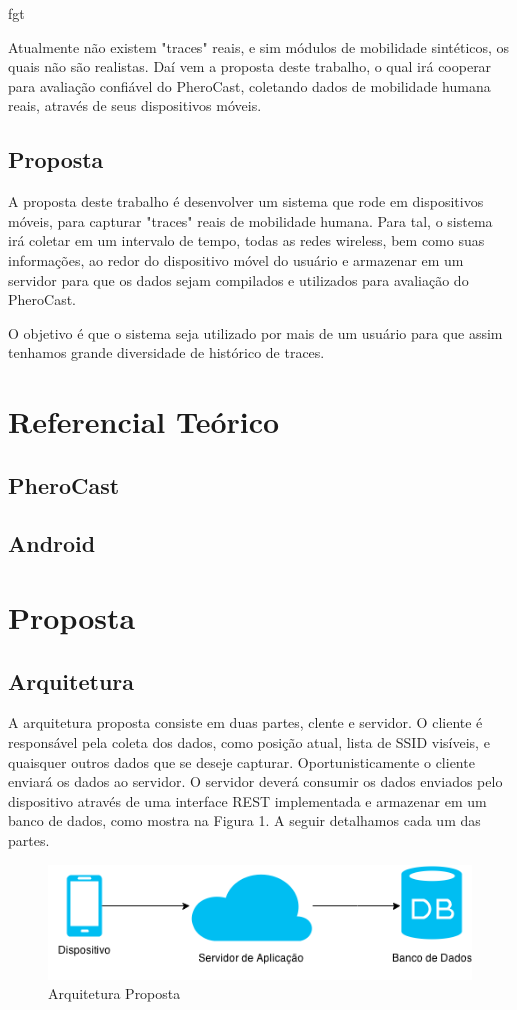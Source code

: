 fgt\documentclass[12pt, %
openright, 
oneside, %
a4paper,    %
brazil]{facom-ufu-abntex2}
\begin{document}
Atualmente não existem "traces" reais, e sim módulos de mobilidade sintéticos, os quais não são realistas. Daí vem a proposta deste trabalho, o qual irá cooperar para avaliação confiável do PheroCast, coletando dados de mobilidade humana reais, através de seus dispositivos móveis.
\section{Proposta}
A proposta deste trabalho é desenvolver um sistema que rode em dispositivos móveis, para capturar "traces" reais de mobilidade humana. Para tal, o sistema irá coletar em um intervalo de tempo, todas as redes wireless, bem como suas informações, ao redor do dispositivo móvel do usuário e armazenar em um servidor para que os dados sejam compilados e utilizados para avaliação do PheroCast.

O objetivo é que o sistema seja utilizado por mais de um usuário para que assim tenhamos grande diversidade de histórico de traces.

\chapter{Referencial Teórico}
\section{PheroCast}
\section{Android}

\chapter{Proposta}
\section{Arquitetura}
A arquitetura proposta consiste em duas partes, clente e servidor. O cliente é responsável pela coleta dos dados, como posição atual, lista de SSID visíveis, e quaisquer outros dados que se deseje capturar. Oportunisticamente o cliente enviará os dados ao servidor. O servidor deverá consumir os dados enviados pelo dispositivo através de uma interface REST implementada e armazenar em um banco de dados, como mostra na Figura 1.  A seguir detalhamos cada um das partes.

\begin{figure}[hbt]
  \includegraphics{arquiteturaProposta}
  \caption{Arquitetura Proposta}
\end{figure}
\end{document}
